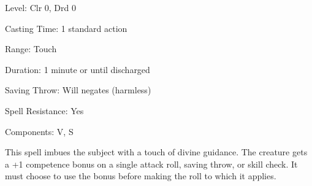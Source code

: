 
\begin{description*}
\item[Level:] Clr 0, Drd 0
\item[Casting Time:] 1 standard action
\item[Range:] Touch
\item[Duration:] 1 minute or until discharged
\item[Saving Throw:] Will negates (harmless)
\item[Spell Resistance:] Yes
\item[Components:] V, S
\end{description*}

This spell imbues the subject with a touch of divine guidance. The creature gets
a +1 competence bonus on a single attack roll, saving throw, or skill check. It
must choose to use the bonus before making the roll to which it applies.